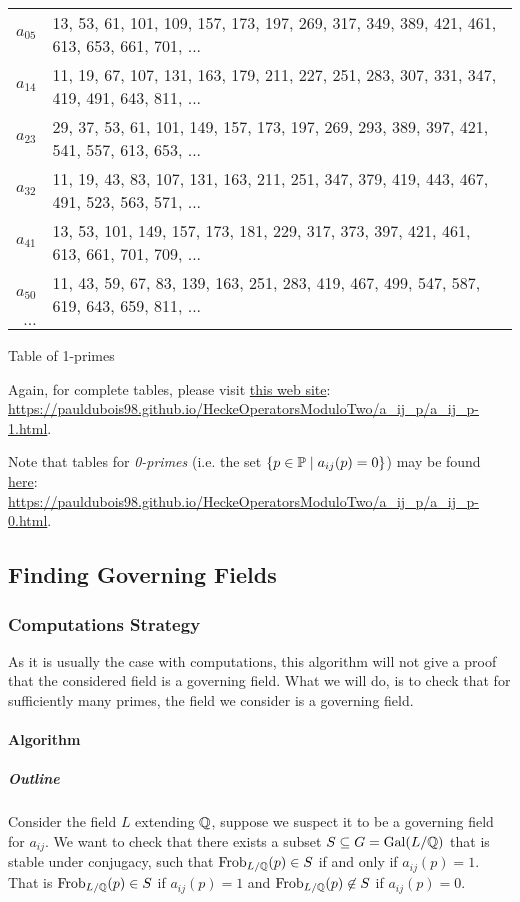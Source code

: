 \begin{center}
\begin{tabular}{|r|l|}
		$ a_{0 5} $ & 13, 53, 61, 101, 109, 157, 173, 197, 269, 317, 349, 389, 421, 461, 613, 653, 661, 701, ...\\
		$ a_{1 4} $ & 11, 19, 67, 107, 131, 163, 179, 211, 227, 251, 283, 307, 331, 347, 419, 491, 643, 811, ...\\
		$ a_{2 3} $ & 29, 37, 53, 61, 101, 149, 157, 173, 197, 269, 293, 389, 397, 421, 541, 557, 613, 653, ...\\       
		$ a_{3 2} $ & 11, 19, 43, 83, 107, 131, 163, 211, 251, 347, 379, 419, 443, 467, 491, 523, 563, 571, ...\\
		$ a_{4 1} $ & 13, 53, 101, 149, 157, 173, 181, 229, 317, 373, 397, 421, 461, 613, 661, 701, 709, ...\\
		$ a_{5 0} $ & 11, 43, 59, 67, 83, 139, 163, 251, 283, 419, 467, 499, 547, 587, 619, 643, 659, 811, ...\\
		$ \dots $ & \\
		\hline
	\end{tabular}

	Table of 1-primes
\end{center}
Again, for complete tables, please visit \href{https://pauldubois98.github.io/HeckeOperatorsModuloTwo/a_ij_p/a_ij_p-1.html}{this web site}:\\ \url{https://pauldubois98.github.io/HeckeOperatorsModuloTwo/a_ij_p/a_ij_p-1.html}.

Note that tables for \textit{0-primes} (i.e. the set $\{ p \in \mathbb{P} \mid a_{ij}(p) = 0 \}$) may be found \href{https://pauldubois98.github.io/HeckeOperatorsModuloTwo/a_ij_p/a_ij_p-0.html}{here}:\\
\url{https://pauldubois98.github.io/HeckeOperatorsModuloTwo/a_ij_p/a_ij_p-0.html}.




\subsection{Finding Governing Fields}
\label{numerics:GoverningFields}
\subsubsection{Computations Strategy}
As it is usually the case with computations, this algorithm will not give a proof that the considered field is a governing field.
What we will do, is to check that for sufficiently many primes, the field we consider is a governing field.

\paragraph{Algorithm}
\subparagraph{Outline}
Consider the field $L$ extending $\mathbb{Q}$, suppose we suspect it to be a governing field for $a_{ij}$.
We want to check that there exists a subset $S \subseteq G = \text{Gal}(L/\mathbb{Q})$ that is stable under conjugacy, such that $\text{Frob}_{L/\mathbb{Q}}(p) \in S$ if and only if $a_{ij}(p)=1$.
That is $\text{Frob}_{L/\mathbb{Q}}(p) \in S$ if $a_{ij}(p)=1$ and $\text{Frob}_{L/\mathbb{Q}}(p) \not \in S$ if $a_{ij}(p)=0$.

